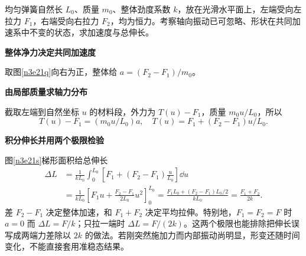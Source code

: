 \begin{question}\begin{example}[不等端力下弹簧的共同加速]\label{n3e21}
均匀弹簧自然长 $L_0$、质量 $m_0$、整体劲度系数 $k$，放在光滑水平面上，左端受向左拉力 $F_1$，右端受向右拉力 $F_2$，均为恒力。考察轴向振动已可忽略、形状在共同加速系中不变的状态，求加速度与总伸长。
\end{example}\end{question}
\begin{solution}\textbf{整体净力决定共同加速度}\par\nobreak
取图\ref{n3e21q}向右为正，整体给 $a=(F_2-F_1)/m_0$。

\par\medskip{}\noindent\textbf{由局部质量求轴力分布}\par\nobreak
截取左端到自然坐标 $u$ 的材料段，外力为 $T(u)-F_1$，质量 $m_0u/L_0$，所以
\[T(u)-F_1=(m_0u/L_0)a,\quad T(u)=F_1+(F_2-F_1)u/L_0.\]


\par\medskip{}\noindent\textbf{积分伸长并用两个极限检验}\par\nobreak
图\ref{n3e21s}梯形面积给总伸长
\begin{align*}
\Delta L&=\frac1{kL_0}\int_0^{L_0}
\left[F_1+(F_2-F_1)\frac{u}{L_0}\right]\dd u\\
&=\frac1{kL_0}\left[F_1u+\frac{F_2-F_1}{2L_0}u^2\right]_0^{L_0}
=\frac{F_1L_0+(F_2-F_1)L_0/2}{kL_0}
=\frac{F_1+F_2}{2k}.
\end{align*}
差 $F_2-F_1$ 决定整体加速，和 $F_1+F_2$ 决定平均拉伸。特别地，$F_1=F_2=F$ 时 $a=0$ 而 $\Delta L=F/k$；只拉一端时 $\Delta L=F/(2k)$。这两个极限也能排除把伸长误写成两端力差除以 $2k$ 的做法。若刚突然施加力而内部振动尚明显，形变还随时间变化，不能直接套用准稳态结果。
\end{solution}
